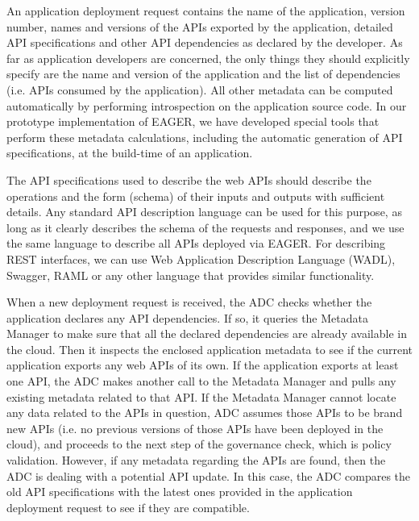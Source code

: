 An application deployment request contains the name of the application, version number, names and versions of the APIs
exported by the application, detailed API specifications and other API dependencies as declared by the developer. As far as application developers are
concerned, the only things they should explicitly specify are the name and version of the application and the list of dependencies (i.e. APIs consumed
by the application). All other metadata can be computed automatically by performing introspection on the
application source code. In our prototype implementation of EAGER, we have developed special tools that perform these metadata calculations, 
including the automatic generation of API specifications, at the build-time of an application.

The API specifications used to describe the web APIs should describe the operations and the form (schema) of their inputs and outputs with sufficient 
details. Any standard API description language can be used for this purpose, as long as it clearly describes the schema of the requests and
responses, and we use the same language to describe all APIs deployed via EAGER. For describing REST interfaces, we can use Web Application
Description Language (WADL), Swagger, RAML or any other language that provides similar functionality. %

When a new deployment request is received, the ADC checks whether the application declares any API dependencies. If so, it
queries the Metadata Manager to make sure that all the declared dependencies are already available in the cloud. 
Then it inspects the enclosed application metadata to see if the current application exports any web
APIs of its own. If the application exports at least one API, the ADC makes another call to the Metadata Manager and pulls any existing 
metadata related to that API. If
the Metadata Manager cannot locate any data related to the APIs in question, ADC assumes those APIs to be brand new
APIs (i.e. no previous versions of those APIs have been deployed in the cloud), and proceeds to the next step of the governance check, which is policy
validation. However, if any metadata regarding the APIs are found, then the ADC is dealing with a potential API update. In this
case, the ADC compares the old API specifications with the latest ones provided in the application deployment request to see if
they are compatible.

